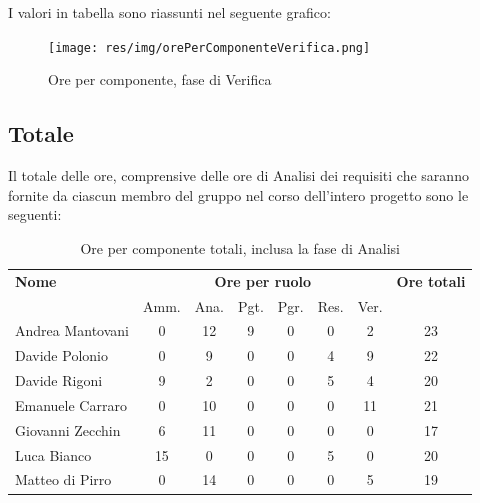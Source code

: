 I valori in tabella sono riassunti nel seguente grafico: \\ 

    \begin{figure}[H]
      \begin{center}
        \texttt{[image: res/img/orePerComponenteVerifica.png]}
      \caption{Ore per componente, fase di Verifica}
      \end{center} 
    \end{figure}    
    
    
    
\pagebreak
\subsection{Totale}
Il totale delle ore, comprensive delle ore di Analisi dei requisiti che saranno fornite da ciascun membro
del gruppo nel corso dell’intero progetto sono le seguenti:

\begin{table}[H]
\begin{tabular}{lccccccc}
\toprule
    \textbf{Nome}  & \multicolumn{6}{c}{\textbf{Ore per ruolo}} & \textbf{Ore totali} \\
     & Amm. & Ana. & Pgt. & Pgr. & Res. & Ver. & \\
    \midrule
    
	Andrea Mantovani & 0 & 12 & 9 & 0 & 0 & 2 & 23 \\
	Davide Polonio & 0 & 9 & 0 & 0 & 4 & 9 & 22 \\
	Davide Rigoni & 9 & 2 & 0 & 0 & 5 & 4 & 20 \\
	Emanuele Carraro & 0 & 10 & 0 & 0 & 0 & 11 & 21 \\
	Giovanni Zecchin & 6 & 11 & 0 & 0 & 0 & 0 & 17 \\
	Luca Bianco & 15 & 0 & 0 & 0 & 5 & 0 & 20 \\
	Matteo di Pirro & 0 & 14 & 0 & 0 & 0 & 5 & 19 \\
    
    \bottomrule
\end{tabular}
\caption{Ore per componente totali, inclusa la fase di Analisi}
\end{table}

